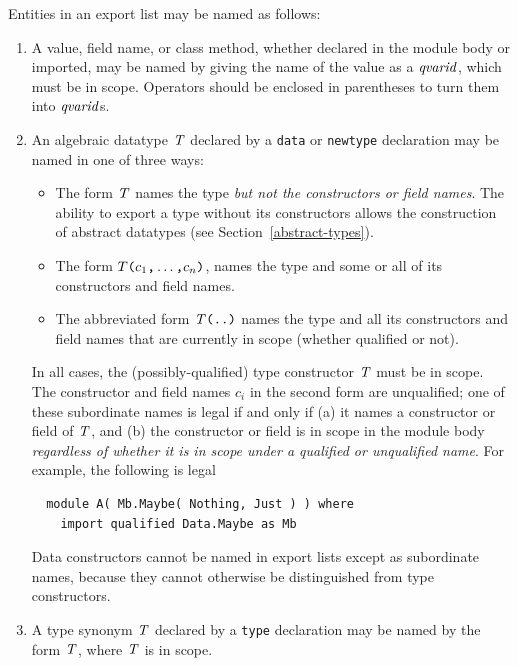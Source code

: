 Entities in an export list may be named as follows:
\begin{enumerate}
\item
A value, field name, or class method, whether declared in
the module body or imported,
may be named by giving the name of the value as a \mbox{$\it qvarid$}, which must be in scope.
Operators should be enclosed in parentheses to turn them into
\mbox{$\it qvarid$}s.  

\item
An algebraic datatype \mbox{$\it T$}
declared by a \mbox{\tt data} or \mbox{\tt newtype} declaration may be named in one of
three ways: 
\begin{itemize}
\item
The form \mbox{$\it T$} names the type {\em but not the constructors or field names}.
The ability to export a type without its constructors allows the
construction of abstract datatypes (see Section~\ref{abstract-types}).
\item
The form $T\mbox{\tt (}c_1\mbox{\tt ,}\ldots\mbox{\tt ,}c_n\mbox{\tt )}$, 
names the type and some or all of its constructors and field names.  
\item
The abbreviated form \mbox{$\it T\makebox{\tt (..)}$} names the type 
and all its constructors and field names that are currently in scope
(whether qualified or not).
\end{itemize}
In all cases, the (possibly-qualified) type constructor \mbox{$\it T$} must be in scope. 
The constructor and field names $c_i$ in the second form are unqualified;
one of these subordinate names is legal if and only if (a) it names a constructor
or field of \mbox{$\it T$}, and (b) the constructor or field
is in scope in the module body {\em regardless of whether it is in scope
under a qualified or unqualified name}. For example, the following is 
legal
\bprog
{\small\begin{verbatim}
  module A( Mb.Maybe( Nothing, Just ) ) where
    import qualified Data.Maybe as Mb
\end{verbatim}}
\eprog
Data constructors cannot be named in export lists except as subordinate names, because
they cannot otherwise be distinguished from type constructors.

\item
A type synonym \mbox{$\it T$} declared by a
\mbox{\tt type} declaration may be named by the form \mbox{$\it T$}, where \mbox{$\it T$} is in scope.


\end{enumerate}
